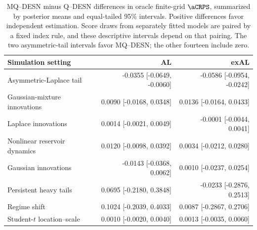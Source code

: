 \begin{table}[!htbp]
\centering
\footnotesize
\setlength{\tabcolsep}{3pt}
\renewcommand{\arraystretch}{1.08}
\begin{tabular}{@{}>{\raggedright\arraybackslash}p{}rr@{}}
\toprule
Simulation setting & AL & exAL \\
\midrule
Asymmetric-Laplace tail & -0.0355 [-0.0649, -0.0060] & -0.0586 [-0.0954, -0.0242] \\
Gaussian-mixture innovations & 0.0090 [-0.0168, 0.0348] & 0.0136 [-0.0164, 0.0433] \\
Laplace innovations & 0.0014 [-0.0021, 0.0049] & -0.0001 [-0.0044, 0.0041] \\
Nonlinear reservoir dynamics & 0.0120 [-0.0098, 0.0392] & 0.0034 [-0.0212, 0.0280] \\
Gaussian innovations & -0.0143 [-0.0368, 0.0062] & 0.0010 [-0.0237, 0.0254] \\
Persistent heavy tails & 0.0695 [-0.2180, 0.3848] & -0.0233 [-0.2876, 0.2513] \\
Regime shift & 0.1024 [-0.2039, 0.4033] & 0.0087 [-0.2867, 0.2706] \\
Student-\(t\) location--scale & 0.0010 [-0.0020, 0.0040] & 0.0013 [-0.0035, 0.0060] \\
\bottomrule
\end{tabular}
\caption{MQ--DESN minus Q--DESN differences in oracle finite-grid \(\aCRPS\), summarized by posterior means and equal-tailed 95\% intervals. Positive differences favor independent estimation. Score draws from separately fitted models are paired by a fixed index rule, and these descriptive intervals depend on that pairing. The two asymmetric-tail intervals favor MQ--DESN; the other fourteen include zero.}
\label{qdesn2026:tab:joint-qdesn-pure-desn-v2-contrasts}
\end{table}

